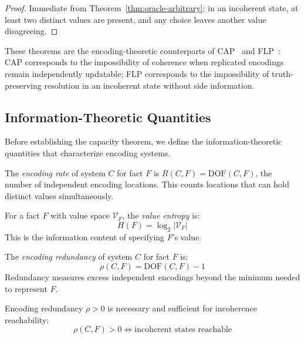 \begin{proof}
Immediate from Theorem~\ref{thm:oracle-arbitrary}: in an incoherent state, at least two distinct values are present, and any choice leaves another value disagreeing.
\end{proof}

These theorems are the encoding-theoretic counterparts of CAP~\cite{brewer2000cap,gilbert2002cap} and FLP~\cite{flp1985impossibility}: CAP corresponds to the impossibility of coherence when replicated encodings remain independently updatable; FLP corresponds to the impossibility of truth-preserving resolution in an incoherent state without side information.

\subsection{Information-Theoretic Quantities}\label{sec:it-quantities}

Before establishing the capacity theorem, we define the information-theoretic quantities that characterize encoding systems.

\begin{definition}\label{def:encoding-rate}
The \emph{encoding rate} of system $C$ for fact $F$ is $R(C, F) = \text{DOF}(C, F)$, the number of independent encoding locations. This counts locations that can hold distinct values simultaneously.
\end{definition}

\begin{definition}\label{def:value-entropy}
For a fact $F$ with value space $\mathcal{V}_F$, the \emph{value entropy} is:
\[
H(F) = \log_2 |\mathcal{V}_F|
\]
This is the information content of specifying $F$'s value.
\end{definition}

\begin{definition}\label{def:redundancy}
The \emph{encoding redundancy} of system $C$ for fact $F$ is:
\[
\rho(C, F) = \text{DOF}(C, F) - 1
\]
Redundancy measures excess independent encodings beyond the minimum needed to represent $F$.
\end{definition}

\begin{theorem}\label{thm:redundancy-incoherence}
Encoding redundancy $\rho > 0$ is necessary and sufficient for incoherence reachability:
\[
\rho(C, F) > 0 \Longleftrightarrow \text{incoherent states reachable}
\]
\end{theorem}


